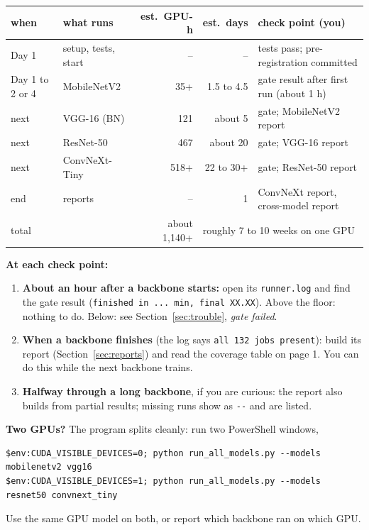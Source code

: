 \documentclass[10.5pt,a4paper]{article}
\newcommand{\cmd}[1]{\texttt{#1}}
\begin{document}
\begin{center}\small
\begin{tabular}{l l r r l}
\toprule
when & what runs & est.\ GPU-h & est.\ days & check point (you) \\
\midrule
Day 1 & setup, tests, start & -- & -- & tests pass; pre-registration committed \\
Day 1 to 2 or 4 & MobileNetV2 & 35+ & 1.5 to 4.5 & gate result after first run (about 1 h) \\
next & VGG-16 (BN) & 121 & about 5 & gate; MobileNetV2 report \\
next & ResNet-50 & 467 & about 20 & gate; VGG-16 report \\
next & ConvNeXt-Tiny & 518+ & 22 to 30+ & gate; ResNet-50 report \\
end & reports & -- & 1 & ConvNeXt report, cross-model report \\
\midrule
\multicolumn{2}{l}{total} & about 1{,}140+ & \multicolumn{2}{l}{roughly 7 to 10 weeks on one GPU} \\
\bottomrule
\end{tabular}
\end{center}

\textbf{At each check point:}
\begin{enumerate}
\item \textbf{About an hour after a backbone starts:} open its \cmd{runner.log} and find the gate result (\cmd{finished in ... min, final XX.XX}). Above the floor: nothing to do. Below: see Section~\ref{sec:trouble}, \emph{gate failed}.
\item \textbf{When a backbone finishes} (the log says \cmd{all 132 jobs present}): build its report (Section~\ref{sec:reports}) and read the coverage table on page 1. You can do this while the next backbone trains.
\item \textbf{Halfway through a long backbone}, if you are curious: the report also builds from partial results; missing runs show as \cmd{-{}-} and are listed.
\end{enumerate}

\textbf{Two GPUs?} The program splits cleanly: run two PowerShell windows,
\begin{lstlisting}
$env:CUDA_VISIBLE_DEVICES=0; python run_all_models.py --models mobilenetv2 vgg16
$env:CUDA_VISIBLE_DEVICES=1; python run_all_models.py --models resnet50 convnext_tiny
\end{lstlisting}
Use the same GPU model on both, or report which backbone ran on which GPU.
\end{document}
